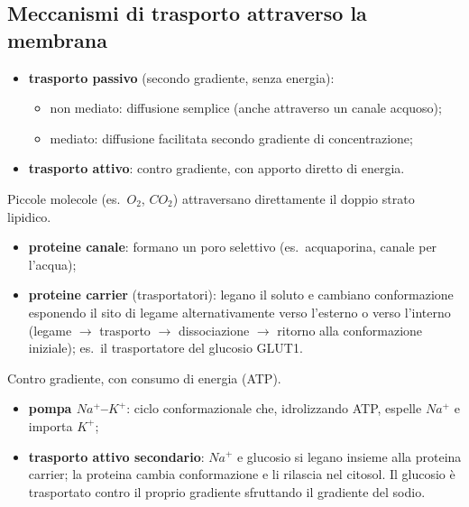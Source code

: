 \subsection{Meccanismi di trasporto attraverso la membrana}

\begin{itemize}
  \item \textbf{trasporto passivo} (secondo gradiente, senza energia):
    \begin{itemize}
      \item non mediato: diffusione semplice (anche attraverso un canale acquoso);
      \item mediato: diffusione facilitata secondo gradiente di concentrazione;
    \end{itemize}
  \item \textbf{trasporto attivo}: contro gradiente, con apporto diretto di energia.
\end{itemize}

Piccole molecole (es.\ $O_2$, $CO_2$) attraversano direttamente il doppio strato lipidico.

\begin{itemize}
  \item \textbf{proteine canale}: formano un poro selettivo (es.\ acquaporina, canale per l'acqua);
  \item \textbf{proteine carrier} (trasportatori): legano il soluto e cambiano conformazione esponendo il sito di legame alternativamente verso l'esterno o verso l'interno (legame $\rightarrow$ trasporto $\rightarrow$ dissociazione $\rightarrow$ ritorno alla conformazione iniziale); es.\ il trasportatore del glucosio GLUT1.
\end{itemize}

Contro gradiente, con consumo di energia (ATP).
\begin{itemize}
  \item \textbf{pompa $Na^+$--$K^+$}: ciclo conformazionale che, idrolizzando ATP, espelle $Na^+$ e importa $K^+$;
  \item \textbf{trasporto attivo secondario}: $Na^+$ e glucosio si legano insieme alla proteina carrier; la proteina cambia conformazione e li rilascia nel citosol. Il glucosio è trasportato contro il proprio gradiente sfruttando il gradiente del sodio.
\end{itemize}

